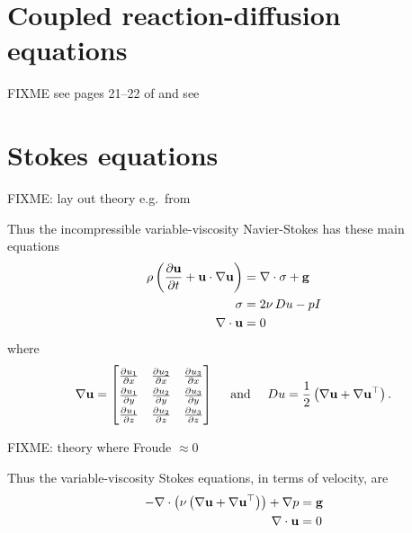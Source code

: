 
\section{Coupled reaction-diffusion equations}

FIXME see pages 21--22 of \citep{HundsdorferVerwer2003} and see \citep{Pearson1993}


\section{Stokes equations}

FIXME: lay out theory e.g.~from \citep{Acheson1990,Elmanetal2005,Ockendonetal2003}

Thus the incompressible variable-viscosity Navier-Stokes has these main equations
\begin{align}
\rho \left(\frac{\partial \mathbf{u}}{\partial t} + \mathbf{u} \cdot \nabla \mathbf{u}\right) &= \nabla\cdot \sigma + \mathbf{g} \label{stokesgeneralconserve} \\
\sigma &= 2 \nu\, Du - p I \label{stokesgenerallaw} \\
\nabla\cdot \mathbf{u} &= 0 \label{stokesgeneralincomp}
\end{align}
where
  $$\grad \bu = \renewcommand{\arraystretch}{1.3}\begin{bmatrix}
    \frac{\partial u_1}{\partial x} & \frac{\partial u_2}{\partial x} & \frac{\partial u_3}{\partial x} \\
    \frac{\partial u_1}{\partial y} & \frac{\partial u_2}{\partial y} & \frac{\partial u_3}{\partial y} \\
    \frac{\partial u_1}{\partial z} & \frac{\partial u_2}{\partial z} & \frac{\partial u_3}{\partial z}
    \end{bmatrix}
    \quad \text{ and } \quad
    D u = \frac{1}{2} \left(\grad \bu + \grad \bu^{\top}\right).$$

FIXME: theory where Froude $\approx 0$

Thus the variable-viscosity Stokes equations, in terms of velocity, are
\begin{align*}
- \nabla\cdot \left(\nu \left(\nabla \mathbf{u} + \nabla \mathbf{u}^{\top}\right)\right) + \nabla p &= \mathbf{g} \\
\nabla\cdot \mathbf{u} &= 0
\end{align*}

